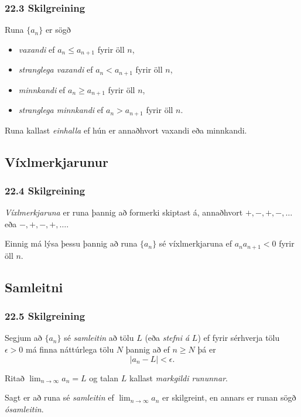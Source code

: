  \subsubsection{22.3 Skilgreining}  
Runa  $\{a_n\}$ er sögð
\pause
\begin{itemize}
\item {\em vaxandi} ef $a_n\leq a_{n+1}$ fyrir öll $n$,\pause
\item {\em stranglega vaxandi} ef $a_n< a_{n+1}$ fyrir öll $n$,\pause
\item {\em minnkandi} ef $a_n\geq a_{n+1}$ fyrir öll $n$,\pause
\item {\em stranglega minnkandi} ef $a_n> a_{n+1}$ fyrir öll $n$.\pause
\end{itemize}


Runa kallast {\em einhalla} ef hún er annaðhvort vaxandi eða
minnkandi.
 


\subsection[t]{Víxlmerkjarunur}
 \subsubsection{22.4 Skilgreining}  
{\em Víxlmerkjaruna} er runa þannig að formerki skiptast
  á, annaðhvort
  $+, -, +, -, \ldots$ eða  $-, +, -, +, \ldots$. 
  \pause
  
  Einnig má lýsa
  þessu þannig að runa $\{a_n\}$ sé víxlmerkjaruna ef $a_na_{n+1}<0$
  fyrir öll $n$.
 


\subsection[t]{Samleitni}
 \subsubsection{22.5 Skilgreining}
Segjum að $\{a_n\}$ sé {\em samleitin} að tölu $L$ (eða {\em stefni á}
$L$) ef fyrir sérhverja tölu $\epsilon>0$ má finna náttúrlega tölu $N$
þannig að ef $n\geq N$ þá er 
$$|a_n-L|<\epsilon.$$
\pause

Ritað
$\lim_{n\rightarrow \infty}a_n=L$ og talan $L$ kallast 
\emph{markgildi rununnar}.   \pause

Sagt er að runa sé {\em samleitin}
ef $\lim_{n\rightarrow \infty}a_n$ er skilgreint, \pause
en annars er runan sögð
{\em ósamleitin}. 


